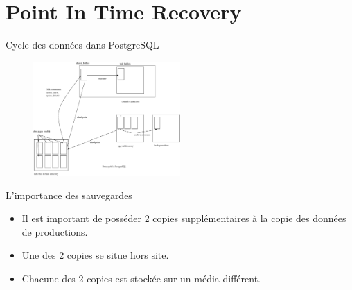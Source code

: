 
\section{Point In Time Recovery}

\begin{frame}{Cycle des données dans PostgreSQL}

\begin{figure}
\begin{center}
\includegraphics[angle=0, width=0.5\textwidth]{images/internals.eps}
\end{center}
\end{figure}

\begin{toile}
\end{toile}

\end{frame}


\begin{frame}{L'importance des sauvegardes}

\begin{itemize}

\item Il est important de posséder 2 copies supplémentaires à la copie des données de productions.
\item Une des 2 copies se situe hors site.
\item Chacune des 2 copies est stockée sur un média différent.

\end{itemize}

\begin{toile}
\end{toile}

\end{frame}

